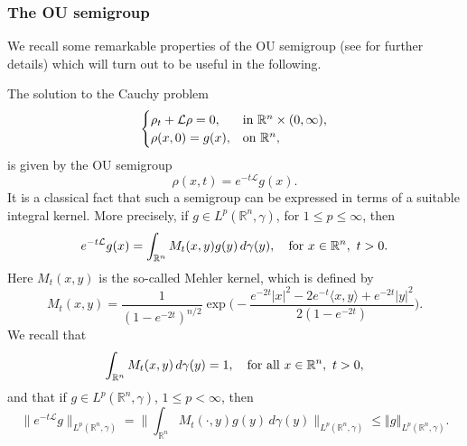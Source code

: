 \documentclass[a4paper,10pt,reqno]{amsart}
\newcommand{\R}{\mathbb{R}}
\numberwithin{equation}{section}
\begin{document}
\subsubsection{The OU semigroup}

We recall some remarkable properties of the OU semigroup (see \cite{AS,bok} for further details)
which will turn out to be useful in the following.

The solution to the Cauchy problem
$$\begin{cases}
\rho_{t}+\mathcal{L}\rho=0,&\hbox{in}~\mathbb{R}^{n}\times(0,\infty), \\
\rho(x,0)=g(x),&\hbox{on}~\mathbb{R}^{n},
\end{cases}$$
is given by the OU semigroup
$$\rho(x,t)=e^{-t\mathcal{L}}g(x).$$
It is a classical fact that such a semigroup can be expressed in terms of a suitable integral kernel.
More precisely, if $g\in L^{p}(\mathbb{R}^{n},\gamma)$, for $1\leq p\leq\infty$, then
\begin{equation}\label{solutsemig}
e^{-t\mathcal{L}}g(x)=\int_{\mathbb{R}^{n}}M_{t}(x,y)g(y)\,d\gamma(y),\quad\hbox{for}~x\in\R^n,~t>0.
\end{equation}
Here $M_{t}(x,y)$ is the so-called Mehler kernel, which is defined by
\begin{equation}\label{eq:Mehler kernel}
M_{t}(x,y)=\frac{1}{(1-e^{-2t})^{n/2}}\exp\bigg(-\frac{e^{-2t}|x|^{2}-2e^{-t}\langle x,y
\rangle+e^{-2t}|y|^{2}}{2(1-e^{-2t})}\bigg).
\end{equation}
We recall that
\begin{equation}\label{M=1}
\int_{\R^n}M_{t}(x,y)\,d\gamma(y)=1,\quad\hbox{for all}~x\in\R^n,~t>0,
\end{equation}
and that if $g\in L^p(\R^n,\gamma)$, $1\leq p<\infty$, then
\begin{equation}\label{Stima Lp semigruppo}
\|e^{-t\mathcal{L}}g\|_{L^p(\R^n,\gamma)}
=\bigg\|\int_{\R^n}M_{t}(\cdot,y)g(y)\,d\gamma(y)\bigg\|_{L^{p}(\R^n,\gamma)}
\leq\left\Vert g\right\Vert _{L^{p}(\R^n,\gamma)}.
\end{equation}
\end{document}
